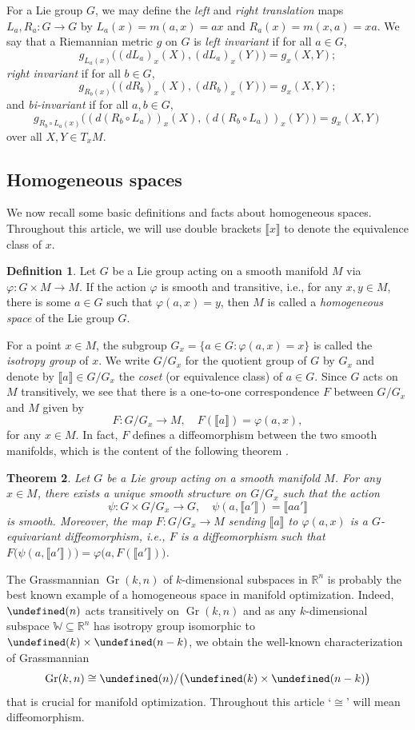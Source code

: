 \documentclass[11pt,reqno]{amsart}%
\newtheorem{theorem}{Theorem}[section]
\theoremstyle{definition}
\newtheorem{definition}[theorem]{Definition}
\theoremstyle{remark}
\newcommand{\lb}{\llbracket}
\newcommand{\rb}{\rrbracket}
\let\O\undefined
\DeclareMathOperator{\Gr}{Gr}
\DeclareMathOperator{\O}{O}
\begin{document}
For a Lie group $G$, we may define the \emph{left} and \emph{right translation} maps $L_a,R_a:G \to G$ by $L_a(x) = m(a,x) = ax$ and $R_a(x) = m(x,a) = xa$. We say that a Riemannian metric $g$ on $G$ is  \emph{left invariant} if for all $a \in G$,
\[
g_{L_a(x)} \bigl((dL_a)_x (X), (dL_a)_x (Y)\bigr) = g_x(X,Y);
\]
\emph{right invariant} if for all $b \in G$,
\[
g_{R_b(x)} \bigl((dR_b)_x (X), (dR_b)_x (Y)\bigr) = g_x(X,Y);
\]
and \emph{bi-invariant} if for all $a,b\in G$,
\[
g_{R_b \circ L_a(x)} \bigl( (d (R_b \circ L_a))_x (X), (d (R_b \circ L_a))_x (Y)\bigr) = g_x(X,Y)
\]
over all $X,Y\in T_xM$.


\subsection{Homogeneous spaces}
We now recall some basic definitions and facts about homogeneous spaces. Throughout this article, we will use double brackets $\lb x\rb$ to denote the equivalence class of $x$.
\begin{definition}
Let $G$ be a Lie group acting on a smooth manifold $M$ via $\varphi: G\times M \to M$. If the action $\varphi$ is smooth and transitive, i.e.,  for any $x,y\in M$, there is some $a\in G$ such that $\varphi(a,x) = y$, then $M$ is called a \emph{homogeneous space} of the Lie group $G$.
\end{definition}
For a point $x\in M$, the subgroup $G_x =\{a\in G: \varphi(a,x) = x\}$ is called the \emph{isotropy group} of $x$. We write $G/G_x$ for the quotient group of $G$ by $G_x$ and denote by $\lb a \rb\in G/G_x$ the \emph{coset} (or equivalence class) of $a\in G$. Since $G$ acts on $M$ transitively, we see that there is  a one-to-one correspondence $F$ between $G/G_{x}$ and $M$ given by
\[
F: G/G_x \to M,\quad F(\lb a\rb) = \varphi(a,x),
\] 
for any $x\in M$. In fact, $F$ defines a diffeomorphism between the two smooth manifolds, which is the content of the following theorem \cite[Theorems~9.2 and 9.3]{Boothby1975}.

\begin{theorem}\label{thm:homogeneous structure}
Let $G$ be a Lie group acting on a smooth manifold $M$. For any $x \in M$, there exists a unique smooth structure on $G/G_x$ such that the action 
\[
\psi: G \times G/G_x \to G, \quad \psi(a, \lb a' \rb) = \lb aa' \rb 
\]
is smooth. Moreover, the map $F: G/G_x \to M$ sending $\lb a \rb$ to $\varphi(a,x)$ is a $G$-equivariant diffeomorphism, i.e., $F$ is a diffeomorphism such that $F\bigl(\psi(a, \lb a' \rb)\bigr) = \varphi \bigl(a, F(\lb a' \rb)\bigr)$.
\end{theorem}
The Grassmannian $\Gr(k,n)$ of $k$-dimensional subspaces in $\mathbb{R}^n$ is probably the best known example of a homogeneous space in manifold optimization. Indeed, $\O(n)$ acts transitively on $\Gr(k,n)$ and as any $k$-dimensional subspace $\mathbb{W} \subseteq \mathbb{R}^n$ has isotropy group  isomorphic to $\O(k)\times \O(n-k)$, we obtain the well-known characterization of Grassmannian
\[
\Gr(k,n) \cong \O(n)/\bigl(\O(k)\times \O(n-k)\bigr)
\]
that is crucial for manifold optimization. Throughout this article `$\cong$' will mean diffeomorphism.
\end{document}
